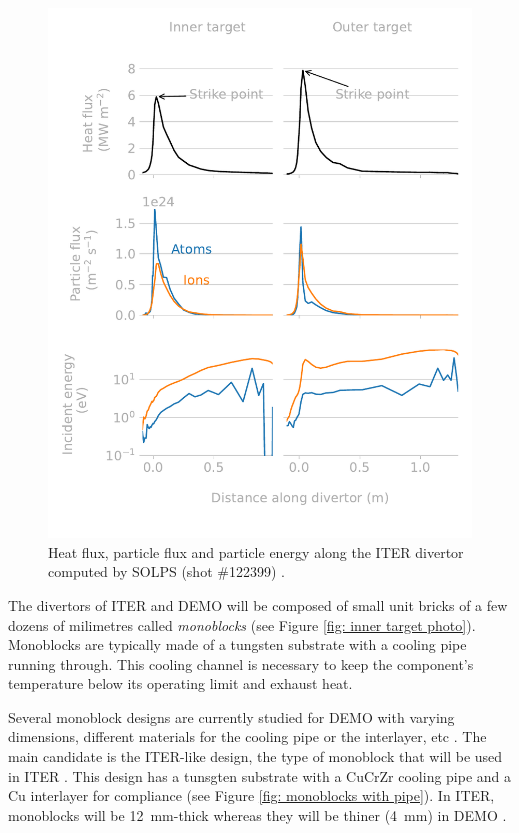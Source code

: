 \begin{figure} [h]
    \centering
    \includegraphics[width=\linewidth]{Figures/Chapter1/divertor_exposure_conditions.pdf}
    \caption{Heat flux, particle flux and particle energy along the ITER divertor computed by SOLPS (shot \#122399) \cite{pitts_physics_2019}.}
\end{figure}

The divertors of ITER and DEMO will be composed of small unit bricks of a few dozens of milimetres called \textit{monoblocks} (see Figure \ref{fig: inner target photo}).
Monoblocks are typically made of a tungsten substrate with a cooling pipe running through.
This cooling channel is necessary to keep the component's temperature below its operating limit and exhaust heat.

Several monoblock designs are currently studied for DEMO with varying dimensions, different materials for the cooling pipe or the interlayer, etc .
The main candidate is the ITER-like design, the type of monoblock that will be used in ITER \cite{hirai_use_2016}.
This design has a tunsgten substrate with a CuCrZr cooling pipe and a Cu interlayer for compliance (see Figure \ref{fig: monoblocks with pipe}).
In ITER, monoblocks will be \SI{12}{mm}-thick whereas they will be thiner (\SI{4}{mm}) in DEMO .

